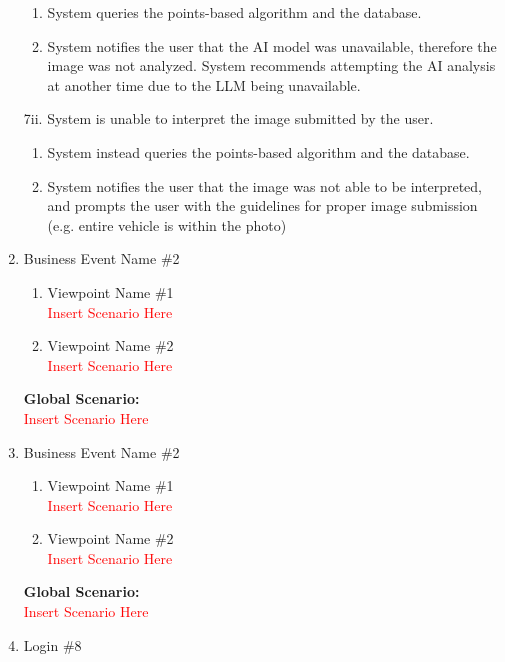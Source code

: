 \documentclass[]{article}
\begin{document}
\begin{enumerate}[{\bf {BE}1.}]
		\begin{enumerate}[{7i}.1]
			\item System queries the points-based algorithm and the database.
			\item System notifies the user that the AI model was unavailable, therefore the image was not analyzed.
			System recommends attempting the AI analysis at another time due to the LLM being unavailable. 
		\end{enumerate}
		7ii. System is unable to interpret the image submitted by the user.
		\begin{enumerate}[{7ii}.1]
			\item System instead queries the points-based algorithm and the database.
			\item System notifies the user that the image was not able to be interpreted, and prompts the user with the guidelines for proper image submission (e.g. entire vehicle is within the photo)
		\end{enumerate}

	\item Business Event Name \#2
	\begin{enumerate}[{\bf VP1.}]
		\item Viewpoint Name \#1 \\
		\textcolor{red}{Insert Scenario Here}
		\item Viewpoint Name \#2 \\
		\textcolor{red}{Insert Scenario Here}
	\end{enumerate}
	{\bf Global Scenario:}\\
	\textcolor{red}{Insert Scenario Here}

	\item Business Event Name \#2
	\begin{enumerate}[{\bf VP1.}]
		\item Viewpoint Name \#1 \\
		\textcolor{red}{Insert Scenario Here}
		\item Viewpoint Name \#2 \\
		\textcolor{red}{Insert Scenario Here}
	\end{enumerate}
	{\bf Global Scenario:}\\
	\textcolor{red}{Insert Scenario Here}

	\item Login \#8 \\


\end{enumerate}
\end{document}
